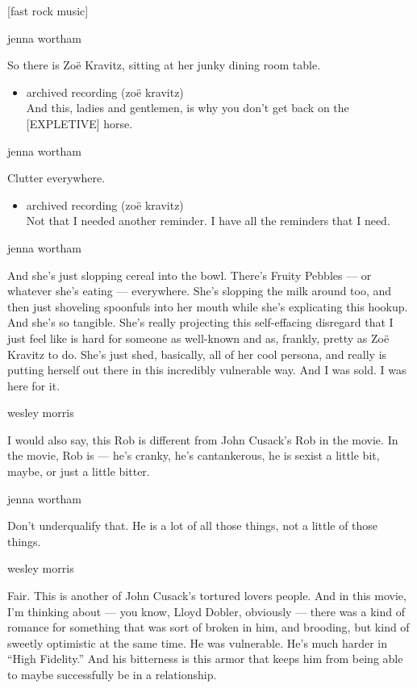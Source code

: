 {[}fast rock music{]}

jenna wortham

So there is Zoë Kravitz, sitting at her junky dining room table.

\begin{itemize}
\tightlist
\item
  archived recording (zoë kravitz)\\
  And this, ladies and gentlemen, is why you don't get back on the
  {[}EXPLETIVE{]} horse.
\end{itemize}

jenna wortham

Clutter everywhere.

\begin{itemize}
\tightlist
\item
  archived recording (zoë kravitz)\\
  Not that I needed another reminder. I have all the reminders that I
  need.
\end{itemize}

jenna wortham

And she's just slopping cereal into the bowl. There's Fruity Pebbles ---
or whatever she's eating --- everywhere. She's slopping the milk around
too, and then just shoveling spoonfuls into her mouth while she's
explicating this hookup. And she's so tangible. She's really projecting
this self-effacing disregard that I just feel like is hard for someone
as well-known and as, frankly, pretty as Zoë Kravitz to do. She's just
shed, basically, all of her cool persona, and really is putting herself
out there in this incredibly vulnerable way. And I was sold. I was here
for it.

wesley morris

I would also say, this Rob is different from John Cusack's Rob in the
movie. In the movie, Rob is --- he's cranky, he's cantankerous, he is
sexist a little bit, maybe, or just a little bitter.

jenna wortham

Don't underqualify that. He is a lot of all those things, not a little
of those things.

wesley morris

Fair. This is another of John Cusack's tortured lovers people. And in
this movie, I'm thinking about --- you know, Lloyd Dobler, obviously ---
there was a kind of romance for something that was sort of broken in
him, and brooding, but kind of sweetly optimistic at the same time. He
was vulnerable. He's much harder in ``High Fidelity.'' And his
bitterness is this armor that keeps him from being able to maybe
successfully be in a relationship.

